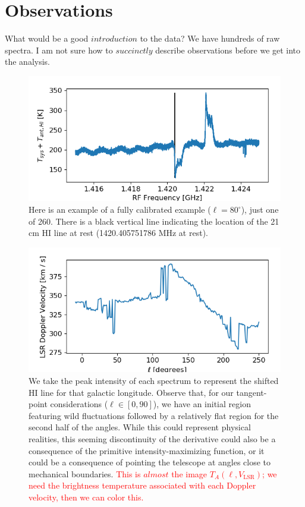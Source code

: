 \documentclass[12pt]{article}
\begin{document}
\section{Observations}

\quad \quad What would be a good $introduction$ to the data? We have hundreds of raw spectra. I am not sure how to $succinctly$ describe observations before we get into the analysis.

\begin{figure}
	\centering
	\includegraphics[width=.8\linewidth]{cal_ex_80_deg}
	\caption{Here is an example of a fully calibrated example ($\ell = 80^\circ$), just one of 260. There is a black vertical line indicating the location of the 21 cm HI line at rest (1420.405751786 MHz at rest).}
	\label{fig:cal_ex}
\end{figure}

\begin{figure}
	\centering
	\includegraphics[width=.8\linewidth]{Doppler_collection}
	\caption{We take the peak intensity of each spectrum to represent the shifted HI line for that galactic longitude.  Observe that, for our tangent-point considerations ($\ell \in [0, 90]$), we have an initial region featuring wild fluctuations followed by a relatively flat region for the second half of the angles. While this could represent physical realities, this seeming discontinuity of the derivative could also be a consequence of the primitive intensity-maximizing function, or it could be a consequence of pointing the telescope at angles close to mechanical boundaries. \textcolor{red}{This is $almost$ the image $T_A(\ell, V_\text{LSR})$; we need the brightness temperature associated with each Doppler velocity, then we can color this.}}
	\label{fig:Dopp_collection}
\end{figure}
\end{document}
